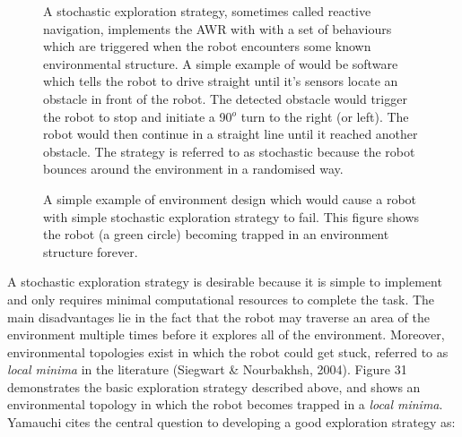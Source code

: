 \documentclass[a4paper]{article}
\begin{document}
\begin{figure}[h]
\begin{minipage}{0.45\textwidth}
A stochastic exploration strategy, sometimes called reactive navigation, implements the AWR with with a set of behaviours which are triggered when the robot encounters some known environmental structure. A simple example of would be software which tells the robot to drive straight until it's sensors locate an obstacle in front of the robot. The detected obstacle would trigger the robot to stop and initiate a 90$^o$ turn to the right (or left). The robot would then continue in a straight line until it reached another obstacle. The strategy is referred to as stochastic because the robot bounces around the environment in a randomised way.
\end{minipage}
\hspace{1cm}
\begin{minipage}{0.45\textwidth}
\centering
{}
\caption{A simple example of environment design which would cause a robot with simple stochastic exploration strategy to fail. This figure shows the robot (a green circle) becoming trapped in an environment structure forever.}
\end{minipage}
\end{figure}

A stochastic exploration strategy is desirable because it is simple to implement and only requires minimal computational resources to complete the task. The main disadvantages lie in the fact that the robot may traverse an area of the environment multiple times before it explores all of the environment. Moreover, environmental topologies exist in which the robot could get stuck, referred to as \textit{local minima} in the literature (Siegwart \& Nourbakhsh, 2004). Figure 31 demonstrates the basic exploration strategy described above, and shows an environmental topology in which the robot becomes trapped in a \textit{local minima}. Yamauchi cites the central question to developing a good exploration strategy as:
\end{document}
